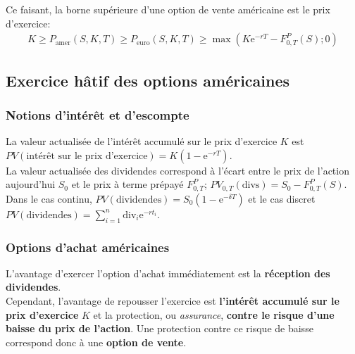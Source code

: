 \documentclass[10pt, french]{article}
\begin{document}
\begin{multicols*}{2}
Ce faisant, \textcolor{cobalt}{la borne supérieure d'une option de vente américaine est le prix d'exercice}:
\begin{align*}
	K	
	\geq	P_{\text{amer}}(S, K, T)
	\geq	P_{\text{euro}}(S, K, T)
	\geq	\max\left(K\textrm{e}^{-rT} - F_{0, T}^{P}(S); 0\right)	
\end{align*}


\columnbreak
\subsection{Exercice hâtif des options américaines}
\subsubsection*{Notions d'intérêt et d'escompte}
La valeur actualisée de l'intérêt accumulé sur le prix d'exercice $K$ est $PV(\text{intérêt sur le prix d'exercice}) = K(1 - \textrm{e}^{-rT})$.\\

La valeur actualisée des dividendes correspond à l'écart entre le prix de l'action aujourd'hui $S_{0}$ et le prix à terme prépayé $F_{0, T}^{P}$; $PV_{0, T}(\text{divs}) = S_{0} - F_{0, T}^{P}(S)$.\\

Dans le cas continu, $PV(\text{dividendes}) = S_{0} (1 - \textrm{e}^{-\delta T})$ et le cas discret $PV(\text{dividendes}) = \sum_{i = 1}^{n} \text{div}_{i} \textrm{e}^{-r t_{i}}$.

\subsubsection*{Options d'achat américaines}
L'avantage d'exercer l'option d'achat immédiatement est la \textbf{réception des dividendes}.\\

Cependant, l'avantage de repousser l'exercice est \textbf{l'intérêt accumulé sur le prix d'exercice} $K$ et la protection, ou \textit{assurance}, \textbf{contre le risque d'une baisse du prix de l'action}. Une protection contre ce risque de baisse correspond donc à une \textbf{option de vente}.\\


\end{multicols*}
\end{document}
